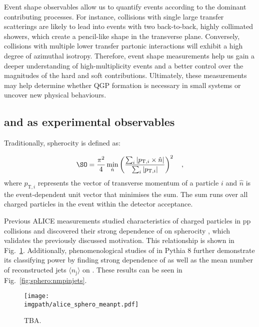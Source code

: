 Event shape observables allow us to quantify events according to the dominant contributing processes. For instance, collisions with single large \pt transfer scatterings are likely to lead into events with two back-to-back, highly collimated showers, which create a pencil-like shape in the transverse plane. Conversely, collisions with multiple lower \pt transfer partonic interactions will exhibit a high degree of azimuthal isotropy. Therefore, event shape measurements help us gain a deeper understanding of high-multiplicity events and a better control over the magnitudes of the hard and soft contributions. Ultimately, these measurements may help determine whether QGP formation is necessary in small systems or uncover new physical behaviours.

\subsection{\SO and \SOPT as experimental observables}

Traditionally, spherocity \SO is defined as:

\begin{align}
\SO = \frac{\pi^2}{4} \min_{\hat{n}} \left(\frac{\sum_i
      |p_{\textrm{T},i} \times \hat{n}|}{\sum_i
      |p_{\textrm{T},i}|}  \right)^2 \quad ,
\end{align}
where $p_{\textrm{T},i}$ represents the vector of transverse momentum of a particle $i$ and $\hat{n}$ is the event-dependent unit vector that minimises the sum. The sum runs over all charged particles in the event within the detector acceptance.

Previous ALICE measurements \cite{alice-spherocity} studied characteristics of charged particles in pp collisions and discovered their strong dependence of \meanpt on spherocity \SO, which validates the previously discussed motivation. This relationship is shown in Fig.~\ref{fig:sphero:nchpt}. Additionally, phenomenological studies of \SO in Pythia 8 further demonstrate its classifying power by finding strong dependence of \meannmpi as well as the mean number of reconstructed jets $\langle n_\mathrm{j} \rangle$ on \SO\cite{antonio-sphero-mpi}\cite{antonio-sphero-njets}. These results can be seen in Fig.~\ref{fig:sphero:nmpinjets}.

\begin{figure}%
\texttt{[image: \\imgpath/alice\_sphero\_meanpt.pdf]}
\caption{TBA.}
\label{fig:sphero:nchpt}
\end{figure}

